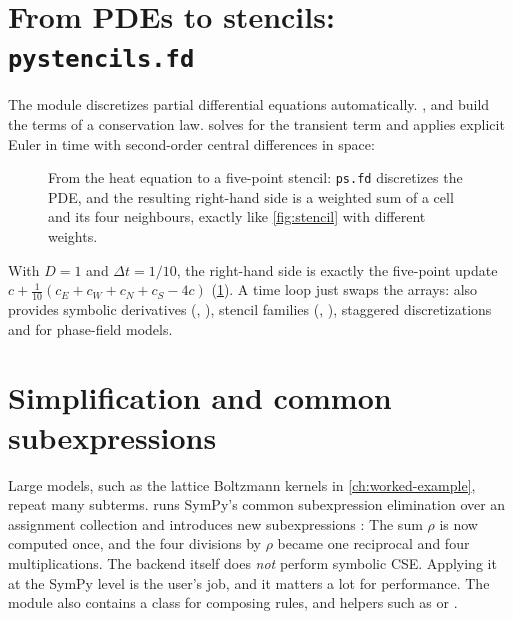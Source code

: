 \section{From PDEs to stencils: \texttt{pystencils.fd}}\label{sec:fd}

The module  discretizes partial differential equations automatically.
,  and  build the terms of a
conservation law.  solves for the transient term
and applies explicit Euler in time with second-order central differences in space:

\begin{figure}[htbp]
  \centering
  
  \caption[From the heat equation to a five-point stencil]{From the heat equation to a five-point stencil: \texttt{ps.fd} discretizes the PDE, and the resulting right-hand side is a weighted sum of a cell and its four neighbours, exactly like \cref{fig:stencil} with different weights.}
  \label{fig:heat-stencil}
\end{figure}
With $D=1$ and $\Delta t=1/10$, the right-hand side is exactly the five-point update
$c + \tfrac{1}{10}(c_E+c_W+c_N+c_S-4c)$ (\cref{fig:heat-stencil}). A time loop just swaps the arrays:
 also provides symbolic derivatives (, ), stencil
families (, ),
staggered discretizations and  for phase-field models.

\section{Simplification and common subexpressions}\label{sec:simp}

Large models, such as the lattice Boltzmann kernels in \cref{ch:worked-example}, repeat
many subterms.  runs SymPy's common subexpression
elimination over an assignment collection and introduces new subexpressions
:
The sum $\rho$ is now computed once, and the four divisions by $\rho$ became one
reciprocal  and four multiplications. The backend itself does \emph{not} perform symbolic CSE. Applying it at the SymPy level
is the user's job, and it matters a lot for performance. The  module also
contains a  class for composing rules, and helpers such as
 or .


